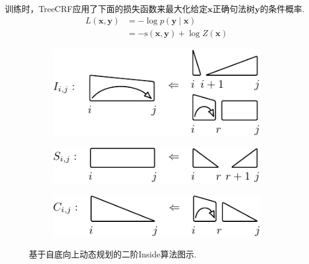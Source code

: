 训练时，TreeCRF应用了下面的损失函数来最大化给定$\boldsymbol{x}$正确句法树$\boldsymbol{y}$的条件概率.
\begin{equation}\label{eq:training-loss-treecrf}
  \begin{split}
    \mathit{L}(\boldsymbol{x},\boldsymbol{y}) &= -\log p(\boldsymbol{y}\mid\boldsymbol{x})  \\
    &= - \mathrm{s}(\boldsymbol{x}, \boldsymbol{y}) + \log Z(\boldsymbol{x})
  \end{split}
\end{equation}

\begin{figure}[tb]
  \centering
  \begin{subfigure}[b]{\textwidth}
    \begin{minipage}{\textwidth}
      \centering
      \includegraphics[scale=1.35]{figures/eisner-2o/a.pdf}
      \label{fig:eisner-2o-a}
    \end{minipage}
  \end{subfigure}
  \begin{subfigure}[b]{\textwidth}
    \begin{minipage}{\textwidth}
      \centering
      \includegraphics[scale=1.35]{figures/eisner-2o/b.pdf}
      \label{fig:eisner-2o-b}
    \end{minipage}
  \end{subfigure}
  \begin{subfigure}[b]{\textwidth}
    \begin{minipage}{\textwidth}
      \centering
      \includegraphics[scale=1.35]{figures/eisner-2o/c.pdf}
      \label{fig:eisner-2o-c}
    \end{minipage}
  \end{subfigure}
  \caption{基于自底向上动态规划的二阶Inside算法图示.}
  \label{fig:eisner-2o}
\end{figure}

